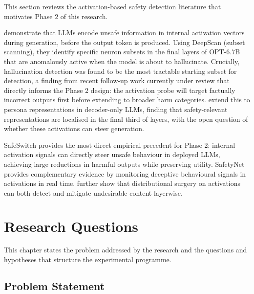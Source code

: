 \documentclass[a4paper,twoside,12pt]{report}
\begin{document}
This section reviews the activation-based safety detection literature that motivates Phase 2
of this research.

\citet{rateike2023} demonstrate that LLMs encode unsafe information in internal activation
vectors during generation, before the output token is produced. Using DeepScan (subset
scanning), they identify specific neuron subsets in the final layers of OPT-6.7B that are
anomalously active when the model is about to hallucinate. Crucially, hallucination detection
was found to be the most tractable starting subset for detection, a finding from recent
follow-up work currently under review that directly informs the Phase 2 design: the
activation probe will target factually incorrect outputs first before extending to broader
harm categories. \citet{cintas2025} extend this to persona representations in decoder-only
LLMs, finding that safety-relevant representations are localised in the final third of
layers, with the open question of whether these activations can steer generation.

SafeSwitch \citep{han2025safeswitch} provides the most direct empirical precedent for
Phase 2: internal activation signals can directly steer unsafe behaviour in deployed LLMs,
achieving large reductions in harmful outputs while preserving utility. SafetyNet
\citep{chaudhary2025safetynet} provides complementary evidence by monitoring deceptive
behavioural signals in activations in real time. \citet{nguyen2025distributional} further
show that distributional surgery on activations can both detect and mitigate undesirable
content layerwise.


\chapter{Research Questions}
\label{ch:research-questions}

This chapter states the problem addressed by the research and the questions and hypotheses
that structure the experimental programme.

\section{Problem Statement}
\label{sec:problem-statement}
\end{document}
